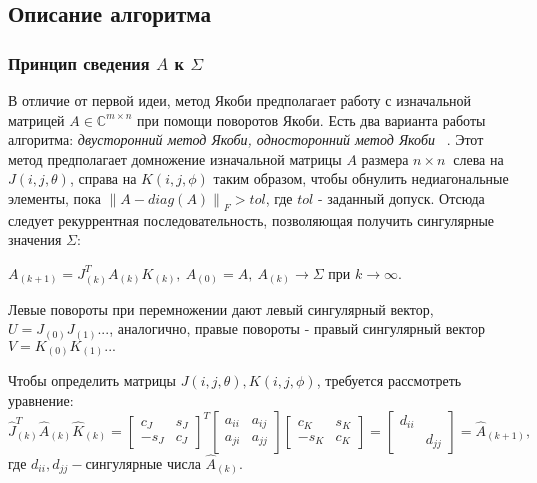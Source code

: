 \subsection{Описание алгоритма}

\subsubsection{Принцип сведения $A$ к $\Sigma$}
В отличие от первой идеи, метод Якоби предполагает работу с изначальной матрицей $A\in \mathbb{C}^{m\times n}$ при помощи поворотов Якоби. Есть два варианта работы алгоритма:\textit{ двусторонний метод Якоби, односторонний метод Якоби} ~\cite{Dongarra2018}.
Этот метод предполагает домножение изначальной матрицы $A$ размера $n\times n \ $ слева на $J(i,j,\theta)$, справа на $K(i,j,\phi)$ таким образом, чтобы обнулить недиагональные элементы, пока $\left\| A - diag(A) \right\|_F > tol$, где $tol$ - заданный допуск. 
Отсюда следует рекуррентная последовательность, позволяющая получить сингулярные значения $\Sigma$:
\begin{center}
    $A_{(k+1)} = J^T_{(k)}A_{(k)}K_{(k)}, \ A_{(0)}= A, \ A_{(k)}\longrightarrow\Sigma \text{ при } k\to\infty$.
\end{center}

Левые повороты при перемножении дают левый сингулярный вектор, $U=J_{(0)}J_{(1)}...$, аналогично, правые повороты - правый сингулярный вектор $V=K_{(0)}K_{(1)}...$

Чтобы определить матрицы $J(i,j,\theta), K(i,j,\phi)$, требуется рассмотреть уравнение:
\begin{equation}
    \hat{J}_{(k)}^T\hat{A}_{(k)}\hat{K}_{(k)} = \begin{bmatrix}
        c_J&s_J\\
        -s_J&c_J
    \end{bmatrix}^T
    \begin{bmatrix}
        a_{ii}&a_{ij}\\
        a_{ji}&a_{jj}
    \end{bmatrix}
    \begin{bmatrix}
        c_K&s_K\\
        -s_K&c_K
    \end{bmatrix} = \begin{bmatrix}
        d_{ii} &\\
        &d_{jj}
    \end{bmatrix} = \hat{A}_{(k+1)},
\end{equation}
где $d_{ii}, d_{jj} -\text{сингулярные числа } \hat{A}_{(k)}$.

